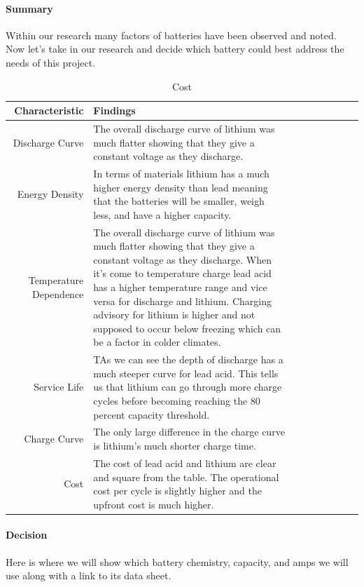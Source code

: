 \paragraph{Summary}
Within our research many factors of batteries have been observed and noted. Now let's take in our research and decide which battery could best address the needs of this project. 
\begin{table}[H]
\centering\scriptsize
\caption{Cost}
\begin{tabularx}{\linewidth}{|r|X|X|X|X|X|X|X|X|}
\hline
 Characteristic & Findings \\ 
\hline\hline

Discharge Curve    & The overall discharge curve of lithium was much flatter showing that they give a constant voltage as they discharge.   \\\hline
Energy Density     & In terms of materials lithium has a much higher energy density than lead meaning that the batteries will be smaller, weigh less, and have a higher capacity. \\\hline
Temperature Dependence     & The overall discharge curve of lithium was much flatter showing that they give a constant voltage as they discharge. When it's come to temperature charge lead acid has a higher temperature range and vice versa for discharge and lithium. Charging advisory for lithium is higher and not supposed to occur below freezing which can be a factor in colder climates.   \\\hline
Service Life     & TAs we can see the depth of discharge has a much steeper curve for lead acid. This tells us that lithium can go through more charge cycles before becoming reaching the 80 percent capacity threshold.   \\\hline
Charge Curve     & The only large difference in the charge curve is lithium's much shorter charge time.   \\\hline
Cost     & The cost of lead acid and lithium are clear and square from the table. The operational cost per cycle is slightly higher and the upfront cost is much higher.   \\\hline

\end{tabularx}
\end{table}

\paragraph{Decision}
Here is where we will show which battery chemistry, capacity, and amps we will use along with a link to its data sheet. 

